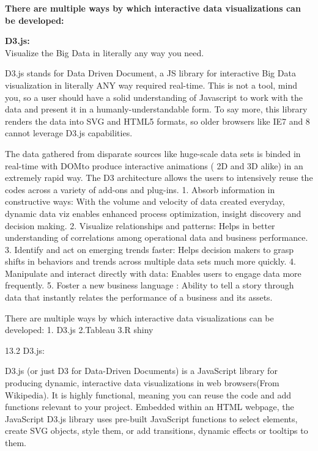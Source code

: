 \documentclass[]{book}
\theoremstyle{definition}
\theoremstyle{definition}
\theoremstyle{definition}
\theoremstyle{remark}
\begin{document}
\citep{benefits_interactive_viz}

\textbf{There are multiple ways by which interactive data visualizations
can be developed:}

\textbf{D3.js:}\\
Visualize the Big Data in literally any way you need.

D3.js stands for Data Driven Document, a JS library for interactive Big
Data visualization in literally ANY way required real-time. This is not
a tool, mind you, so a user should have a solid understanding of
Javascript to work with the data and present it in a
humanly-understandable form. To say more, this library renders the data
into SVG and HTML5 formats, so older browsers like IE7 and 8 cannot
leverage D3.js capabilities.

The data gathered from disparate sources like huge-scale data sets is
binded in real-time with DOMto produce interactive animations ( 2D and
3D alike) in an extremely rapid way. The D3 architecture allows the
users to intensively reuse the codes across a variety of add-ons and
plug-ins. 1. Absorb information in constructive ways: With the volume
and velocity of data created everyday, dynamic data viz enables enhanced
process optimization, insight discovery and decision making. 2.
Visualize relationships and patterns: Helps in better understanding of
correlations among operational data and business performance. 3.
Identify and act on emerging trends faster: Helps decision makers to
grasp shifts in behaviors and trends across multiple data sets much more
quickly. 4. Manipulate and interact directly with data: Enables users to
engage data more frequently. 5. Foster a new business language : Ability
to tell a story through data that instantly relates the performance of a
business and its assets.

\citep{benefits_interactive_viz}

There are multiple ways by which interactive data visualizations can be
developed: 1. D3.js 2.Tableau 3.R shiny

13.2 D3.js:

D3.js (or just D3 for Data-Driven Documents) is a JavaScript library for
producing dynamic, interactive data visualizations in web browsers(From
Wikipedia). It is highly functional, meaning you can reuse the code and
add functions relevant to your project. Embedded within an HTML webpage,
the JavaScript D3.js library uses pre-built JavaScript functions to
select elements, create SVG objects, style them, or add transitions,
dynamic effects or tooltips to them.
\end{document}
